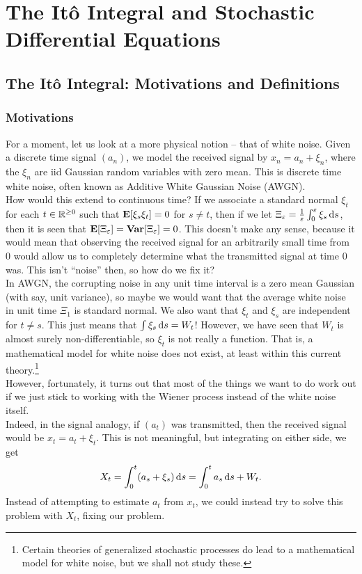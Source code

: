 \section{The It\^{o} Integral and Stochastic Differential Equations}

\subsection{The It\^{o} Integral: Motivations and Definitions}

\subsubsection*{Motivations}

For a moment, let us look at a more physical notion -- that of white noise. Given a discrete time signal $(a_n)$, we model the received signal by $x_n = a_n + \xi_n$, where the $\xi_n$ are iid Gaussian random variables with zero mean. This is discrete time white noise, often known as Additive White Gaussian Noise (AWGN).\\
How would this extend to continuous time? If we associate a standard normal $\xi_t$ for each $t\in\mathbb{R}^{\geq 0}$ such that $\textbf{E}[\xi_s\xi_t]=0$ for $s\neq t$, then if we let $\Xi_\varepsilon = \frac{1}{\varepsilon} \int_0^\varepsilon \xi_s\operatorname{d}\!{s}$, then it is seen that $\textbf{E}[\Xi_\varepsilon] = \operatorname{\textbf{Var}}[\Xi_\varepsilon] = 0$. This doesn't make any sense, because it would mean that observing the received signal for an arbitrarily small time from $0$ would allow us to completely determine what the transmitted signal at time $0$ was. This isn't ``noise'' then, so how do we fix it?\\
In AWGN, the corrupting noise in any unit time interval is a zero mean Gaussian (with say, unit variance), so maybe we would want that the average white noise in unit time $\Xi_1$ is standard normal. We also want that $\xi_t$ and $\xi_s$ are independent for $t\neq s$. This just means that $\int \xi_s \operatorname{d}\!{s} = W_t$! However, we have seen that $W_t$ is almost surely non-differentiable, so $\xi_t$ is not really a function. That is, a mathematical model for white noise does not exist, at least within this current theory.\footnote{Certain theories of generalized stochastic processes do lead to a mathematical model for white noise, but we shall not study these.}\\
However, fortunately, it turns out that most of the things we want to do work out if we just stick to working with the Wiener process instead of the white noise itself.\\
Indeed, in the signal analogy, if $(a_t)$ was transmitted, then the received signal would be $x_t = a_t + \xi_t$. This is not meaningful, but integrating on either side, we get
\[ X_t = \int_0^t (a_s + \xi_s)\operatorname{d}\!{s} = \int_0^t a_s\operatorname{d}\!{s} + W_t.  \]
Instead of attempting to estimate $a_t$ from $x_t$, we could instead try to solve this problem with $X_t$, fixing our problem.\\

